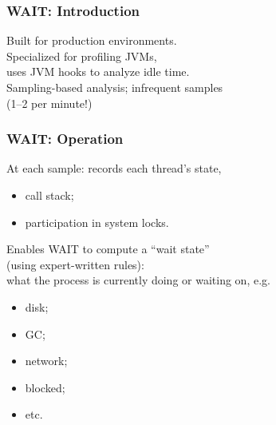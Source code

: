 \begin{frame}
  \frametitle{WAIT: Introduction}

\large
\begin{changemargin}{1.5cm}

Built for production environments.\\[1em]

Specialized for profiling JVMs, \\uses JVM hooks to analyze idle time.\\[1em]

Sampling-based analysis; infrequent samples\\ (1--2 per minute!)
\end{changemargin}
\end{frame}


\begin{frame}
  \frametitle{WAIT: Operation}

\large
\begin{changemargin}{1.5cm}

  At each sample: records each thread's state,
\begin{itemize}
\item call stack;
\item participation in system locks.
\end{itemize}

  Enables WAIT to compute a ``wait state'' \\(using expert-written rules): \\
what the process is currently doing or waiting on, e.g.
\begin{itemize}
\item disk;
\item GC;
\item network; 
\item blocked; 
\item etc.
\end{itemize}
\end{changemargin}

\end{frame}


